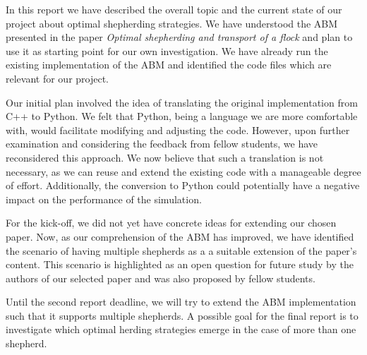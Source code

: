 In this report we have described the overall topic and the current state of our project about optimal shepherding strategies. We have understood the ABM presented in the paper \textit{Optimal shepherding and transport of a flock} and plan to use it as starting point for our own investigation. We have already run the existing implementation of the ABM and identified the code files which are relevant for our project.

Our initial plan involved the idea of translating the original implementation from C++ to Python. We felt that Python, being a language we are more comfortable with, would facilitate modifying and adjusting the code. However, upon further examination and considering the feedback from fellow students, we have reconsidered this approach. We now believe that such a translation is not necessary, as we can reuse and extend the existing code with a manageable degree of effort. Additionally, the conversion to Python could potentially have a negative impact on the performance of the simulation.

For the kick-off, we did not yet have concrete ideas for extending our chosen paper. Now, as our comprehension of the ABM has improved, we have identified the scenario of having multiple shepherds as a a suitable extension of the paper's content. This scenario is highlighted as an open question for future study by the authors of our selected paper and was also proposed by fellow students.

Until the second report deadline, we will try to extend the ABM implementation such that it supports multiple shepherds. A possible goal for the final report is to investigate which optimal herding strategies emerge in the case of more than one shepherd.
